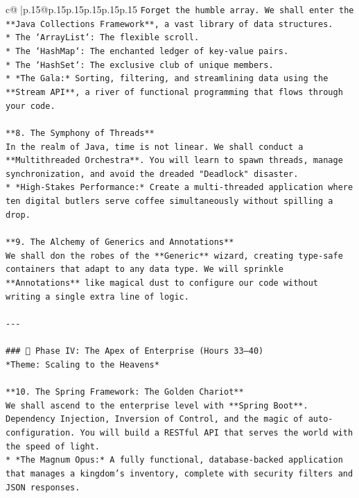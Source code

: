 \documentclass{article}
\begin{document}
{\begin{supertabular}{c@{$\;$}|p{.15\linewidth}@{}p{.15\linewidth}p{.15\linewidth}p{.15\linewidth}p{.15\linewidth}p{.15\linewidth}}
{{{\texttt{Forget the humble array. We shall enter the **Java Collections Framework**, a vast library of data structures.} \\
\texttt{*   The `ArrayList`: The flexible scroll.} \\
\texttt{*   The `HashMap`: The enchanted ledger of key{-}value pairs.} \\
\texttt{*   The `HashSet`: The exclusive club of unique members.} \\
\texttt{*   *The Gala:* Sorting, filtering, and streamlining data using the **Stream API**, a river of functional programming that flows through your code.} \\
\\ 
\texttt{**8. The Symphony of Threads**} \\
\texttt{In the realm of Java, time is not linear. We shall conduct a **Multithreaded Orchestra**. You will learn to spawn threads, manage synchronization, and avoid the dreaded "Deadlock" disaster.} \\
\texttt{*   *High{-}Stakes Performance:* Create a multi{-}threaded application where ten digital butlers serve coffee simultaneously without spilling a drop.} \\
\\ 
\texttt{**9. The Alchemy of Generics and Annotations**} \\
\texttt{We shall don the robes of the **Generic** wizard, creating type{-}safe containers that adapt to any data type. We will sprinkle **Annotations** like magical dust to configure our code without writing a single extra line of logic.} \\
\\ 
\texttt{{-}{-}{-}} \\
\\ 
\texttt{\#\#\# 🚀 Phase IV: The Apex of Enterprise (Hours 33–40)} \\
\texttt{*Theme: Scaling to the Heavens*} \\
\\ 
\texttt{**10. The Spring Framework: The Golden Chariot**} \\
\texttt{We shall ascend to the enterprise level with **Spring Boot**. Dependency Injection, Inversion of Control, and the magic of auto{-}configuration. You will build a RESTful API that serves the world with the speed of light.} \\
\texttt{*   *The Magnum Opus:* A fully functional, database{-}backed application that manages a kingdom's inventory, complete with security filters and JSON responses.} \\
}}}
\end{supertabular}}
\end{document}
